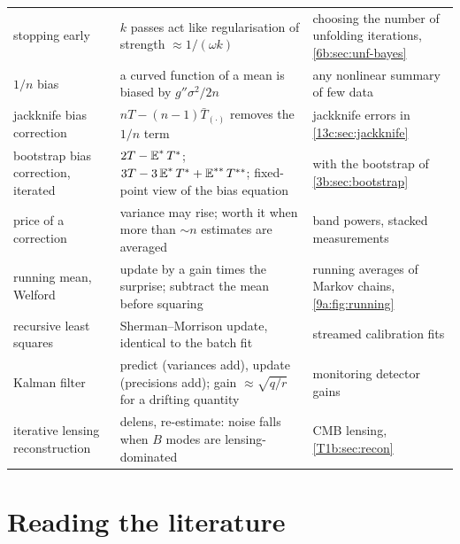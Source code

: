 \begin{center}
\begin{tabularx}{\linewidth}{@{}>{\raggedright}p{30mm}>{\raggedright}X>{\raggedright\arraybackslash}p{30mm}@{}}
stopping early & $k$ passes act like regularisation of strength $\approx1/(\omega k)$ & choosing the number of unfolding iterations, \cref{6b:sec:unf-bayes}\\
$1/n$ bias & a curved function of a mean is biased by $g''\sigma^2/2n$ & any nonlinear summary of few data\\
jackknife bias correction & $nT-(n-1)\bar T_{(\cdot)}$ removes the $1/n$ term & jackknife errors in \cref{13c:sec:jackknife}\\
bootstrap bias correction, iterated & $2T-\E^*T^*$; $3T-3\E^*T^*+\E^{**}T^{**}$; fixed-point view of the bias equation & with the bootstrap of \cref{3b:sec:bootstrap}\\
price of a correction & variance may rise; worth it when more than $\sim n$ estimates are averaged & band powers, stacked measurements\\
running mean, Welford & update by a gain times the surprise; subtract the mean before squaring & running averages of Markov chains, \cref{9a:fig:running}\\
recursive least squares & Sherman--Morrison update, identical to the batch fit & streamed calibration fits\\
Kalman filter & predict (variances add), update (precisions add); gain $\approx\sqrt{q/r}$ for a drifting quantity & monitoring detector gains\\
iterative lensing reconstruction & delens, re-estimate: noise falls when $B$ modes are lensing-dominated & CMB lensing, \cref{T1b:sec:recon}\\
\bottomrule
\end{tabularx}
\end{center}

\section*{Reading the literature}
\label{T5b:sec:reading}

